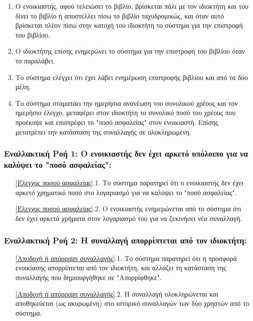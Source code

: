 \documentclass[12pt,a4paper]{article}
\begin{document}
\begin{enumerate}
        \label{Τέλος χρημάτων}
    \item Ο ενοικιαστής, αφού τελειώσει το βιβλίο, βρίσκεται πάλι με τον ιδιοκτήτη και του δίνει το βιβλίο ή αποστέλλει πίσω το βιβλίο ταχυδρομικώς, και όταν αυτό βρίσκεται πλέον πίσω στην κατοχή του ιδιοκτήτη το σύστημα για την επιστροφή του βιβλίου.
    \item Ο ιδιοκτήτης επίσης ενημερώνει το σύστημα για την επιστροφή του βιβλίου όταν το παραλάβει.
        \label{Επιστροφή βιβλίου - Τέλος λεφτά δεν φτάνουν}
    \item Το σύστημα ελέγχει ότι έχει λάβει ενημέρωση επιστροφής βιβλίου και από τα δύο μέλη. 
    \item Το σύστημα σταματάει την ημερήσια ανανέωση του συνολικού χρέους και τον ημερήσιο έλεγχο, μεταφέρει στον ιδιοκτήτη το συνολικό ποσό του χρέους που προέκυψε και επιστρέφει το "ποσό ασφαλείας" στον ενοικιαστή. Επίσης μετατρέπει την κατάσταση της συναλλαγής σε ολοκληρωμένη.
        \label{Τέλος ενοικίασης}
\end{enumerate}

\subsubsection*{Εναλλακτική Ροή 1: Ο ενοικιαστής δεν έχει αρκετό υπόλοιπο για να καλύψει το "ποσό ασφαλείας":}
\begin{enumerate}
    \item[\ref{Έλεγχος ποσού ασφαλείας}.1.] Το σύστημα παρατηρεί ότι ο ενοικιαστής δεν έχει αρκετό χρηματικό ποσό στο λογαριασμό για να καλύψει το "ποσό ασφαλείας".
    \item[\ref{Έλεγχος ποσού ασφαλείας}.2.] Ο ενοικιαστής ενημερώνεται από το σύστημα ότι δεν έχει αρκετά χρήματα στον λογαριασμό του για να ξεκινήσει νέα συναλλαγή.
\end{enumerate}

\subsubsection*{Εναλλακτική Ροή 2: Η συναλλαγή απορρίπτεται από τον ιδιοκτήτη:}
\begin{enumerate}
    \item[\ref{Αποδοχή ή απόρριψη συναλλαγής}.1.] Το σύστημα παρατηρεί ότι η προσφορά ενοικίασης απορρίπτεται από τον ιδιοκτήτη, και αλλάζει τη κατάσταση της συναλλαγής που δημιουργήθηκε σε "Απορρίφθηκε".
    \item[\ref{Αποδοχή ή απόρριψη συναλλαγής}.2.] Η συναλλαγή ολοκληρώνεται και αποθηκεύεται (ως ακυρωμένη) στο ιστορικό συναλλαγών των δύο χρηστών από το σύστημα.
\end{enumerate}
\end{document}
